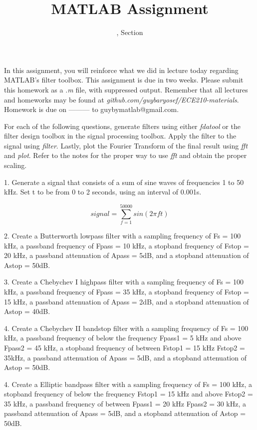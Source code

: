\documentclass[11pt]{article}
\title{MATLAB Assignment \Homework}
\author{\Session, Section \Section}
\date{}
\makeatletter
\def\MyEmail{guybymatlab@gmail.com}
\def\DateOfSubmission{ --------- }
\makeatother
\begin{document}
\maketitle
In this assignment, you will reinforce what we did in lecture today
regarding MATLAB's filter toolbox.
This assignment is due in two weeks.
Please submit this homework as a \textit{.m} file, 
with suppressed output.
Remember that all lectures and homeworks may be found at 
\textit{github.com/guybaryosef/ECE210-materials}.
Homework is due on \DateOfSubmission to \MyEmail.

For each of the following questions,
generate filters using either \emph{fdatool} or the filter design toolbox in
the signal processing toolbox.
Apply the filter to the signal using \emph{filter}.
Lastly, plot the Fourier Transform of the final result using \emph{fft} and \emph{plot}.
Refer to the notes for the proper way to use \emph{fft} and obtain the proper scaling.

1. Generate a signal that consists of a sum of sine waves of frequencies 1 to 50 kHz.
Set t to be from 0 to 2 seconds, using an interval of 0.001s. 

$$ signal = \sum_{f=1}^{50000} sin(2\pi ft)$$

2. Create a Butterworth lowpass filter with a sampling frequency of Fs = 100 kHz,
a passband frequency of Fpass = 10 kHz, a stopband frequency of Fstop = 20 kHz,
a passband attenuation of Apass = 5dB, and a stopband attenuation of Astop = 50dB.

3. Create a Chebychev I highpass filter with a sampling frequency of Fs = 100 kHz,
a passband frequency of Fpass = 35 kHz, a stopband frequency of Fstop = 15 kHz,
a passband attenuation of Apass = 2dB, and a stopband attenuation of Astop = 40dB.

4. Create a Chebychev II bandstop filter with a sampling frequency of Fs = 100 kHz,
a passband frequency of below the frequency Fpass1 = 5 kHz and above Fpass2 = 45 kHz,
a stopband frequency of between Fstop1 = 15 kHz Fstop2 = 35kHz,
a passband attenuation of Apass = 5dB, and a stopband attenuation of Astop = 50dB.

4. Create a Elliptic bandpass filter with a sampling frequency of Fs = 100 kHz,
a stopband frequency of below the frequency Fstop1 = 15 kHz and above Fstop2 = 35 kHz,
a passband frequency of between Fpass1 = 20 kHz Fpass2 = 30 kHz,
a passband attenuation of Apass = 5dB, and a stopband attenuation of Astop = 50dB.
\end{document}

